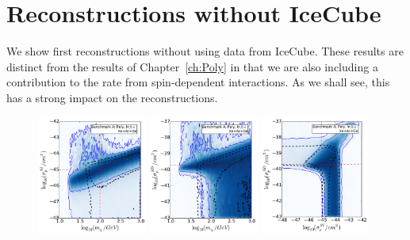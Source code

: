 \section{Reconstructions without IceCube}
\label{sec:NT:withoutIC}

We show first reconstructions without using data from IceCube. These results are distinct from the results of Chapter~\ref{ch:Poly} in that we are also including a contribution to the rate from spin-dependent interactions. As we shall see, this has a strong impact on the reconstructions.

\begin{figure}[!ht]
  \centering
  \includegraphics[width=0.32\textwidth]{NT/BenchmarkA_poly_noIC-mx_sigsi.pdf}
  \includegraphics[width=0.32\textwidth]{NT/BenchmarkA_poly_noIC-mx_sigsd.pdf}
  \includegraphics[width=0.32\textwidth]{NT/BenchmarkA_poly_noIC-sigsi_sigsd.pdf}


\end{figure}
